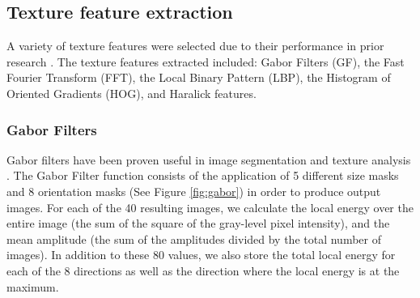 \subsection{Texture feature extraction}

A variety of texture features were selected due to their performance in prior research \cite{RodriguezDamian_2006, Redondo_2015, Maillard_2003, Marcos_2015}.
The texture features extracted included: Gabor Filters (GF), the Fast Fourier Transform (FFT), the Local Binary Pattern (LBP), the Histogram of Oriented Gradients (HOG), and Haralick features.

\subsubsection{Gabor Filters}

Gabor filters have been proven useful in image segmentation and texture analysis \cite{Zheng_2004}. The Gabor Filter function consists of the application of 5 different size masks and 8 orientation masks (See Figure \ref{fig:gabor}) in order to produce output images. For each of the 40 resulting images, we calculate the local energy over the entire image (the sum of the square of the gray-level pixel intensity), and the mean amplitude (the sum of the amplitudes divided by the total number of images). In addition to these 80 values, we also store the total local energy for each of the 8 directions as well as the direction where the local energy is at the maximum.

  
  
  
  
  
  
  
  
  
  
  
